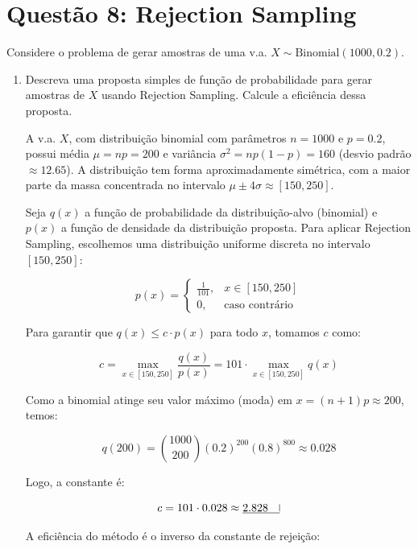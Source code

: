 \documentclass[12 pt]{article}
\begin{document}
\section*{Questão 8: Rejection Sampling}

Considere o problema de gerar amostras de uma v.a. $X \sim \text{Binomial}(1000, 0.2)$.

\begin{enumerate}
    \item Descreva uma proposta simples de função de probabilidade para gerar amostras de $X$ usando Rejection Sampling. Calcule a eficiência dessa proposta.
    \begin{tcolorbox}[colframe=black, title=Resposta:]
        A v.a. $X$, com distribuição binomial com parâmetros $n = 1000$ e $p = 0.2$, possui média $\mu = np = 200$ e variância $\sigma^2 = np(1 - p) = 160$ (desvio padrão $\approx 12.65$). A distribuição tem forma aproximadamente simétrica, com a maior parte da massa concentrada no intervalo $\mu \pm 4\sigma \approx [150, 250]$.
        
        Seja $q(x)$ a função de probabilidade da distribuição-alvo (binomial) e $p(x)$ a função de densidade da distribuição proposta. Para aplicar Rejection Sampling, escolhemos uma distribuição uniforme discreta no intervalo $[150, 250]$:
        
        $$
        p(x) = \begin{cases}
        \frac{1}{101}, & x \in [150, 250] \\
        0, & \text{caso contrário}
        \end{cases}
        $$
        
        Para garantir que $q(x) \leq c \cdot p(x)$ para todo $x$, tomamos $c$ como:
        
        $$
        c = \max_{x \in [150, 250]} \frac{q(x)}{p(x)} = 101 \cdot \max_{x \in [150, 250]} q(x)
        $$
        
        Como a binomial atinge seu valor máximo (moda) em $x = (n+1)p  \approx 200$, temos:
        
        $$
        q(200) = \binom{1000}{200} (0.2)^{200} (0.8)^{800} \approx 0.028
        $$
        
        Logo, a constante é:
        
        $$
        c = 101 \cdot 0.028 \approx \underline{2.828 \quad \vline}
        $$
        
        A eficiência do método é o inverso da constante de rejeição:
        

\end{tcolorbox}
\end{enumerate}
\end{document}
